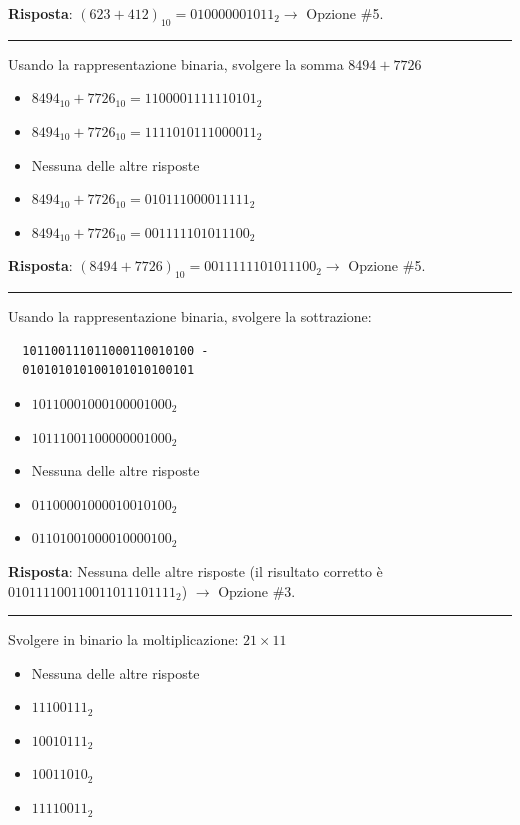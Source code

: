 \documentclass[12pt, a4paper]{article}
\begin{document}
\textbf{Risposta}: $(623+412)_{10} = 010000001011_2 \rightarrow$ Opzione \#5.

\vspace{0.5cm}
\hrule
\vspace{0.5cm}

Usando la rappresentazione binaria, svolgere la somma $8494+7726$
\begin{itemize}
    \item[$\square$] $8494_{10}+7726_{10} = 1100001111110101_2$
    \item[$\square$] $8494_{10}+7726_{10} = 1111010111000011_2$
    \item[$\square$] Nessuna delle altre risposte
    \item[$\square$] $8494_{10}+7726_{10} = 010111000011111_2$
    \item[$\blacksquare$] $8494_{10}+7726_{10} = 001111101011100_2$
\end{itemize}

\textbf{Risposta}: $(8494+7726)_{10} = 0011111101011100_2 \rightarrow$ Opzione \#5.

\vspace{0.5cm}
\hrule
\vspace{0.5cm}


Usando la rappresentazione binaria, svolgere la sottrazione:
\begin{verbatim}
  101100111011000110010100 - 
  010101010100101010100101
\end{verbatim}

\begin{itemize}
    \item[$\square$] $10110001000100001000_2$
    \item[$\square$] $10111001100000001000_2$
    \item[$\blacksquare$] Nessuna delle altre risposte
    \item[$\square$] $01100001000010010100_2$
    \item[$\square$] $01101001000010000100_2$
\end{itemize}
\textbf{Risposta}: Nessuna delle altre risposte (il risultato corretto è $010111100110011011101111_2$) $\rightarrow$ Opzione \#3.

\vspace{0.5cm}
\hrule
\vspace{0.5cm}

Svolgere in binario la moltiplicazione: $21 \times 11$
\begin{itemize}
    \item[$\square$] Nessuna delle altre risposte
    \item[$\blacksquare$] $11100111_2$
    \item[$\square$] $10010111_2$
    \item[$\square$] $10011010_2$
    \item[$\square$] $11110011_2$
\end{itemize}
\end{document}
